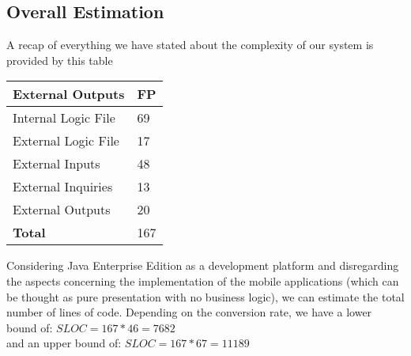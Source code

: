 \subsection{Overall Estimation}
A recap of everything we have stated about the complexity of our system is provided by this table\\
\begin{tabular}{|l|l|}
\hline
\textbf{External Outputs} & \textbf{FP} \\
\hline

Internal Logic File & 69\\
External Logic File & 17\\
External Inputs & 48\\
External Inquiries & 13\\
External Outputs & 20\\
\hline
\textbf{Total} & 167\\
\hline
\end{tabular}
Considering Java Enterprise Edition as a development platform and disregarding the aspects concerning the implementation of the mobile applications (which can be thought as pure presentation with no business logic), we can estimate the total number of lines of code. Depending on the conversion rate, we have a lower bound of: 
$ SLOC = 167 * 46 = 7 682$\\
and an upper bound of:
$ SLOC = 167 * 67 = 11 189$\\